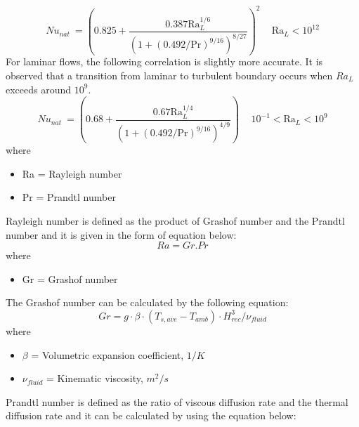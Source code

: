 \begin{equation}
{Nu_{nat}} \ = \left({0.825 + \frac{0.387 \mathrm{Ra}_L^{1/6}}{\left(1 + (0.492/\mathrm{Pr})^{9/16} \right)^{8/27} }}\right)^2 \, \quad \mathrm{Ra}_L < 10^{12}
\end{equation}
For laminar flows, the following correlation is slightly more accurate. It is observed that a transition from laminar to turbulent boundary occurs when $Ra_{L}$ exceeds around $10^{9}$.
\begin{equation}
{Nu_{nat}} \ = \left(0.68 + \frac{0.67 \mathrm{Ra}_L^{1/4}}{\left(1 + (0.492/\mathrm{Pr})^{9/16}\right)^{4/9}}\right) \, \quad \mathrm10^{-1} < \mathrm{Ra}_L < 10^9 
\end{equation}
where 
\begin{itemize}
	\item Ra = Rayleigh number
	\item Pr = Prandtl number
\end{itemize}
Rayleigh number is defined as the product of Grashof number and the Prandtl number and it is given in the form of equation below:
\begin{equation}
Ra=Gr.Pr
\end{equation}
where 
\begin{itemize}
	\item Gr = Grashof number
\end{itemize}
The Grashof number can be calculated by the following equation:
\begin{equation}
Gr=g \cdot \beta\cdot (T_{s,ave}-T_{amb})\cdot {H_{rec}^3/\nu_{fluid}}
\end{equation}
where 
\begin{itemize}
	\item $\beta$ = Volumetric expansion coefficient, $1/K$
	\item $\nu_{fluid}$ = Kinematic viscosity, $m^2/s$
\end{itemize}
Prandtl number is defined as the ratio of viscous diffusion rate and the thermal diffusion rate and it can be calculated by using the equation below:
